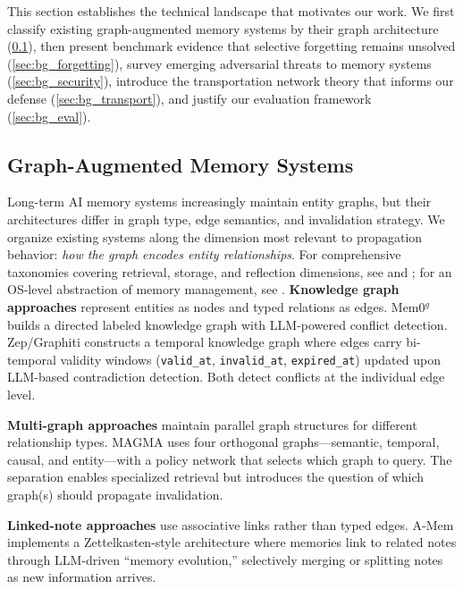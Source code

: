 \documentclass[11pt]{article}
\begin{document}
This section establishes the technical landscape that motivates our work.
We first classify existing graph-augmented memory systems by their graph architecture (\cref{sec:bg_graph}), then present benchmark evidence that selective forgetting remains unsolved (\cref{sec:bg_forgetting}), survey emerging adversarial threats to memory systems (\cref{sec:bg_security}), introduce the transportation network theory that informs our defense (\cref{sec:bg_transport}), and justify our evaluation framework (\cref{sec:bg_eval}).

\subsection{Graph-Augmented Memory Systems}
\label{sec:bg_graph}

Long-term AI memory systems increasingly maintain entity graphs, but their architectures differ in graph type, edge semantics, and invalidation strategy.
We organize existing systems along the dimension most relevant to propagation behavior: \textit{how the graph encodes entity relationships}.
For comprehensive taxonomies covering retrieval, storage, and reflection dimensions, see \citet{graph_agent_memory_survey_2026} and \citet{hu_memory_age_2025}; for an OS-level abstraction of memory management, see \citet{li_memos_2025}.
\textbf{Knowledge graph approaches} represent entities as nodes and typed relations as edges.
Mem0$^g$ \citep{mem0_2024} builds a directed labeled knowledge graph with LLM-powered conflict detection.
Zep/Graphiti \citep{zep_2025} constructs a temporal knowledge graph where edges carry bi-temporal validity windows (\texttt{valid\_at}, \texttt{invalid\_at}, \texttt{expired\_at}) updated upon LLM-based contradiction detection.
Both detect conflicts at the individual edge level.

\textbf{Multi-graph approaches} maintain parallel graph structures for different relationship types.
MAGMA \citep{magma_2026} uses four orthogonal graphs---semantic, temporal, causal, and entity---with a policy network that selects which graph to query.
The separation enables specialized retrieval but introduces the question of which graph(s) should propagate invalidation.

\textbf{Linked-note approaches} use associative links rather than typed edges.
A-Mem \citep{amem_2025} implements a Zettelkasten-style architecture where memories link to related notes through LLM-driven ``memory evolution,'' selectively merging or splitting notes as new information arrives.
\end{document}
